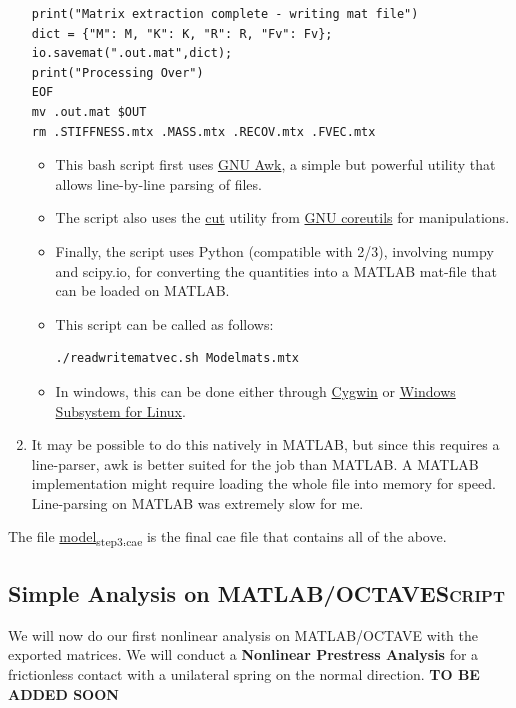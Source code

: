 \documentclass[11pt]{article}
\begin{document}
\begin{enumerate}
\begin{verbatim}
print("Matrix extraction complete - writing mat file")
dict = {"M": M, "K": K, "R": R, "Fv": Fv};
io.savemat(".out.mat",dict);
print("Processing Over")
EOF
mv .out.mat $OUT
rm .STIFFNESS.mtx .MASS.mtx .RECOV.mtx .FVEC.mtx
\end{verbatim}
\begin{itemize}
\item This bash script first uses \href{https://www.gnu.org/software/gawk/manual/gawk.html}{GNU Awk}, a simple but powerful utility that allows line-by-line parsing of files.
\item The script also uses the \href{https://www.gnu.org/software/coreutils/cut}{cut} utility from \href{https://www.gnu.org/software/coreutils/cut}{GNU coreutils} for manipulations.
\item Finally, the script uses Python (compatible with 2/3), involving numpy and scipy.io, for converting the quantities into a MATLAB mat-file that can be loaded on MATLAB.
\item This script can be called as follows:
\begin{verbatim}
./readwritematvec.sh Modelmats.mtx
\end{verbatim}
\item In windows, this can be done either through \href{https://www.cygwin.com/}{Cygwin} or \href{https://learn.microsoft.com/en-us/windows/wsl/install}{Windows Subsystem for Linux}.
\end{itemize}
\item It may be possible to do this natively in MATLAB, but since this requires a line-parser, awk is better suited for the job than MATLAB.
A MATLAB implementation might require loading the whole file into memory for speed.
Line-parsing on MATLAB was extremely slow for me.
\end{enumerate}
The file \href{https://github.com/Nidish96/Abaqus4Joints/blob/main/assets/assembly/model\_step3.cae}{model\textsubscript{step3.cae}} is the final cae file that contains all of the above.
\subsection{Simple Analysis on MATLAB/OCTAVE\hfill{}\textsc{Script}}
\label{sec:orgc178edd}
We will now do our first nonlinear analysis on MATLAB/OCTAVE with the exported matrices.
We will conduct a \textbf{Nonlinear Prestress Analysis} for a frictionless contact with a unilateral spring on the normal direction.
\textbf{TO BE ADDED SOON}
\end{document}
